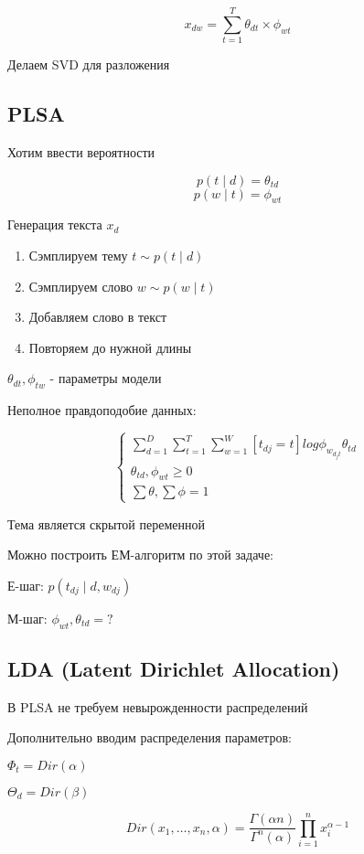\documentclass[a4paper, 12pt]{article}
\begin{document}
\[x_{dw} = \sum_{t = 1}^{T} \theta_{dt} \times \phi_{wt}\]

Делаем SVD для разложения 

\subsection{PLSA}

Хотим ввести вероятности

\[p(t \mid d) = \theta_{td}\]
\[p(w \mid t) = \phi_{wt}\]

Генерация текста $x_d$

\begin{enumerate}
    \item Сэмплируем тему $t \sim p(t \mid d)$
    \item Сэмплируем слово $w \sim p(w \mid t)$
    \item Добавляем слово в текст
    \item Повторяем до нужной длины
\end{enumerate}

$\theta_{dt}, \phi_{tw}$ - параметры модели

Неполное правдоподобие данных:

\[\begin{cases}
    \sum_{d = 1}^D \sum_{t = 1}^T \sum_{w = 1}^W[t_{dj} = t]log\phi_{w_{d_jt}}\theta_{td} \\
    \theta_{td}, \phi_{wt} \geq 0 \\
    \sum \theta, \sum \phi = 1
\end{cases}
\]

Тема является скрытой переменной

Можно построить ЕМ-алгоритм по этой задаче:

Е-шаг: $p(t_{dj} \mid d, w_{dj})$

М-шаг: $\phi_{wt}, \theta_{td} = ?$

\subsection{LDA (Latent Dirichlet Allocation)}

В PLSA не требуем невырожденности распределений

Дополнительно вводим распределения параметров:

$\Phi_t = Dir(\alpha)$

$\Theta_d = Dir(\beta)$

\[Dir(x_1, \ldots, x_n, \alpha) = \frac{\Gamma (\alpha n)}{\Gamma^n(\alpha)}\prod_{i = 1}^n x_i^{\alpha - 1}\]
\end{document}
